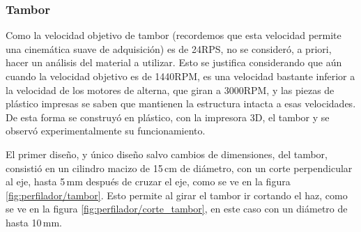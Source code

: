 \subsubsection{Tambor}
Como la velocidad objetivo de tambor (recordemos que esta velocidad permite una cinemática suave de adquisición) es de 24RPS, no se consideró, a priori, hacer un análisis del material a utilizar. Esto se justifica considerando que aún cuando la velocidad objetivo es de 1440RPM, es una velocidad bastante inferior a la velocidad de los  motores de alterna, que giran a 3000RPM, y las piezas de plástico impresas se saben que mantienen la estructura intacta a esas velocidades. De esta forma se construyó en plástico, con la impresora 3D, el tambor y se observó experimentalmente su funcionamiento.

El primer diseño, y único diseño salvo cambios de dimensiones, del tambor, consistió en un cilindro macizo de 15$\,$cm de diámetro, con un corte perpendicular al eje, hasta 5$\,$mm después de cruzar el eje, como se ve en la figura \ref{fig:perfilador/tambor}. Esto permite al girar el tambor ir cortando el haz, como se ve en la figura \ref{fig:perfilador/corte_tambor}, en este caso con un diámetro de hasta 10$\,$mm. 


